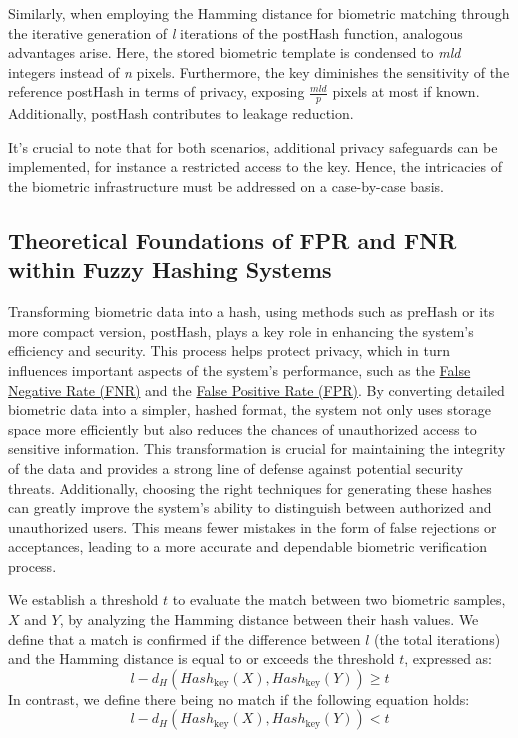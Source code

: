 Similarly, when employing the Hamming distance for biometric matching through the iterative generation of \textit{l} iterations of the postHash function, analogous advantages arise. Here, the stored biometric template is condensed to \textit{mld} integers instead of \textit{n} pixels. Furthermore, the key diminishes the sensitivity of the reference postHash in terms of privacy, exposing \(\frac{mld}{p}\) pixels at most if known. Additionally, postHash contributes to leakage reduction.

It's crucial to note that for both scenarios, additional privacy safeguards can be implemented, for instance a restricted access to the key. Hence, the intricacies of the biometric infrastructure must be addressed on a case-by-case basis.

\subsection{Theoretical Foundations of FPR and FNR within Fuzzy Hashing Systems}

Transforming biometric data into a hash, using methods such as preHash or its more compact version, postHash, plays a key role in enhancing the system's efficiency and security. This process helps protect privacy, which in turn influences important aspects of the system's performance, such as the \hyperref[def:FNR]{False Negative Rate (FNR)} and the \hyperref[def:FPR]{False Positive Rate (FPR)}. By converting detailed biometric data into a simpler, hashed format, the system not only uses storage space more efficiently but also reduces the chances of unauthorized access to sensitive information. This transformation is crucial for maintaining the integrity of the data and provides a strong line of defense against potential security threats. Additionally, choosing the right techniques for generating these hashes can greatly improve the system's ability to distinguish between authorized and unauthorized users. This means fewer mistakes in the form of false rejections or acceptances, leading to a more accurate and dependable biometric verification process.

We establish a threshold \(t\) to evaluate the match between two biometric samples, \(X\) and \(Y\), by analyzing the Hamming distance between their hash values.
We define that a match is confirmed if the difference between \(l\) (the total iterations) and the Hamming distance is equal to or exceeds the threshold \(t\), expressed as: \[l - d_H(Hash_{\text{key}}(X), Hash_{\text{key}}(Y)) \geq t\]
In contrast, we define there being no match if the following equation holds: \[l - d_H(Hash_{\text{key}}(X), Hash_{\text{key}}(Y)) < t\]

